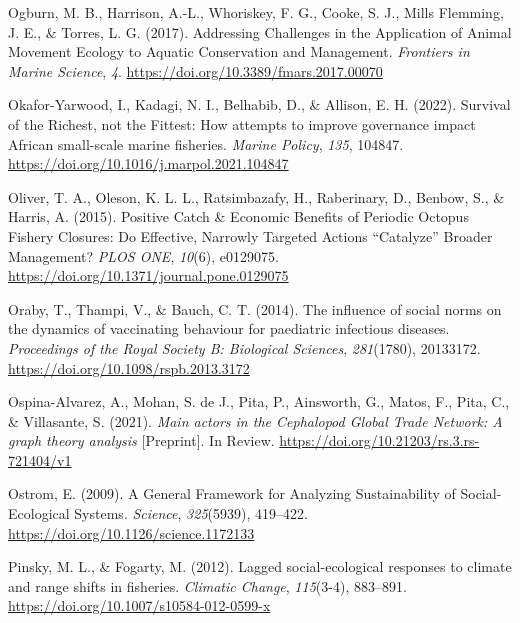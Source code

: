 \documentclass[
  12pt,
]{article}
\newlength{\cslhangindent}
\newlength{\cslentryspacingunit} %
\newenvironment{CSLReferences}[2] %
 {%
  \setlength{\parindent}{0pt}
  \ifodd #1
  \let\oldpar\par
  \def\par{\hangindent=\cslhangindent\oldpar}
  \fi
  \setlength{\parskip}{#2\cslentryspacingunit}
 }%
 {}
\begin{document}
\begin{CSLReferences}{1}{2}
\leavevmode{}%
Ogburn, M. B., Harrison, A.-L., Whoriskey, F. G., Cooke, S. J., Mills Flemming, J. E., \& Torres, L. G. (2017). Addressing {Challenges} in the {Application} of {Animal} {Movement} {Ecology} to {Aquatic} {Conservation} and {Management}. \emph{Frontiers in Marine Science}, \emph{4}. \url{https://doi.org/10.3389/fmars.2017.00070}

\leavevmode{}%
Okafor-Yarwood, I., Kadagi, N. I., Belhabib, D., \& Allison, E. H. (2022). Survival of the {Richest}, not the {Fittest}: {How} attempts to improve governance impact {African} small-scale marine fisheries. \emph{Marine Policy}, \emph{135}, 104847. \url{https://doi.org/10.1016/j.marpol.2021.104847}

\leavevmode{}%
Oliver, T. A., Oleson, K. L. L., Ratsimbazafy, H., Raberinary, D., Benbow, S., \& Harris, A. (2015). Positive {Catch} \& {Economic} {Benefits} of {Periodic} {Octopus} {Fishery} {Closures}: {Do} {Effective}, {Narrowly} {Targeted} {Actions} {``{Catalyze}''} {Broader} {Management}? \emph{PLOS ONE}, \emph{10}(6), e0129075. \url{https://doi.org/10.1371/journal.pone.0129075}

\leavevmode{}%
Oraby, T., Thampi, V., \& Bauch, C. T. (2014). The influence of social norms on the dynamics of vaccinating behaviour for paediatric infectious diseases. \emph{Proceedings of the Royal Society B: Biological Sciences}, \emph{281}(1780), 20133172. \url{https://doi.org/10.1098/rspb.2013.3172}

\leavevmode{}%
Ospina-Alvarez, A., Mohan, S. de J., Pita, P., Ainsworth, G., Matos, F., Pita, C., \& Villasante, S. (2021). \emph{Main actors in the {Cephalopod} {Global} {Trade} {Network}: A graph theory analysis} {[}Preprint{]}. In Review. \url{https://doi.org/10.21203/rs.3.rs-721404/v1}

\leavevmode{}%
Ostrom, E. (2009). A {General} {Framework} for {Analyzing} {Sustainability} of {Social}-{Ecological} {Systems}. \emph{Science}, \emph{325}(5939), 419--422. \url{https://doi.org/10.1126/science.1172133}

\leavevmode{}%
Pinsky, M. L., \& Fogarty, M. (2012). Lagged social-ecological responses to climate and range shifts in fisheries. \emph{Climatic Change}, \emph{115}(3-4), 883--891. \url{https://doi.org/10.1007/s10584-012-0599-x}


\end{CSLReferences}
\end{document}
